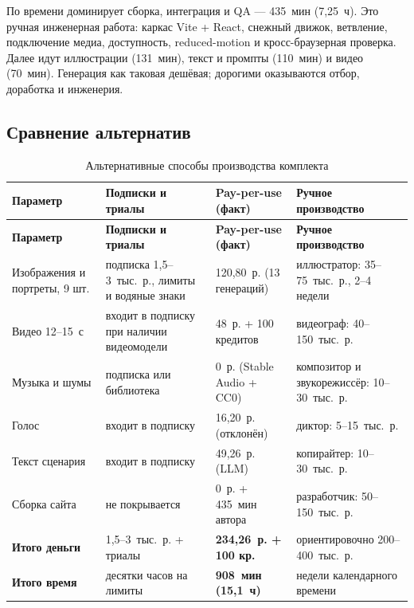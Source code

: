 \documentclass[12pt, a4paper]{article}
\begin{document}
По времени доминирует сборка, интеграция и QA --- 435~мин (7{,}25~ч). Это ручная инженерная работа: каркас Vite + React, снежный движок, ветвление, подключение медиа, доступность, reduced-motion и кросс-браузерная проверка. Далее идут иллюстрации (131~мин), текст и промпты (110~мин) и видео (70~мин). Генерация как таковая дешёвая; дорогими оказываются отбор, доработка и инженерия.

\subsection{Сравнение альтернатив}
\begin{scriptsize}
\setlength{\tabcolsep}{3pt}
\begin{longtable}{@{}L{3.1cm}L{4.0cm}L{4.0cm}L{4.0cm}@{}}
\caption{Альтернативные способы производства комплекта}\label{tab:alternatives}\\
\toprule
\textbf{Параметр} & \textbf{Подписки и триалы} & \textbf{Pay-per-use (факт)} & \textbf{Ручное производство} \\
\midrule
\endfirsthead
\toprule
\textbf{Параметр} & \textbf{Подписки и триалы} & \textbf{Pay-per-use (факт)} & \textbf{Ручное производство} \\
\midrule
\endhead
\bottomrule
\endlastfoot
Изображения и портреты, 9 шт. & подписка 1{,}5--3~тыс.~р., лимиты и водяные знаки & 120{,}80~р. (13 генераций) & иллюстратор: 35--75~тыс.~р., 2--4 недели \\
\addlinespace
Видео 12--15~с & входит в подписку при наличии видеомодели & 48~р. + 100 кредитов & видеограф: 40--150~тыс.~р. \\
\addlinespace
Музыка и шумы & подписка или библиотека & 0~р. (Stable Audio + CC0) & композитор и звукорежиссёр: 10--30~тыс.~р. \\
\addlinespace
Голос & входит в подписку & 16{,}20~р. (отклонён) & диктор: 5--15~тыс.~р. \\
\addlinespace
Текст сценария & входит в подписку & 49{,}26~р. (LLM) & копирайтер: 10--30~тыс.~р. \\
\addlinespace
Сборка сайта & не покрывается & 0~р. + 435~мин автора & разработчик: 50--150~тыс.~р. \\
\addlinespace
\textbf{Итого деньги} & 1{,}5--3~тыс.~р. + триалы & \textbf{234{,}26~р. + 100 кр.} & ориентировочно 200--400~тыс.~р. \\
\addlinespace
\textbf{Итого время} & десятки часов на лимиты & \textbf{908~мин (15{,}1~ч)} & недели календарного времени \\
\end{longtable}
\end{scriptsize}
\end{document}
